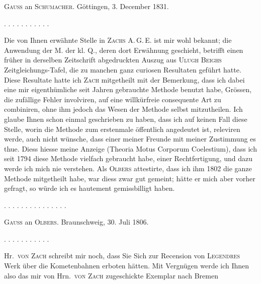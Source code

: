 \clearpage
{}
\begin{center}
\textsc{Gauss} an \textsc{Schumacher}. Göttingen, 3. December 1831.
\end{center}

\begin{center}
. . . . . . . . . . .
\end{center}

Die von Ihnen erwähnte Stelle in \textsc{Zachs} A.\,G.\,E. ist mir wohl bekannt; die Anwendung der M. der kl. Q., deren dort Erwähnung geschieht, betrifft einen früher in derselben Zeitschrift abgedruckten Auszug aus \textsc{Ulugh Beighs} Zeitgleichungs-Tafel, die zu manchen ganz curiosen Resultaten geführt hatte. Diese Resultate hatte ich \textsc{Zach} mitgetheilt mit der Bemerkung, dass ich dabei eine mir eigenthümliche seit Jahren gebrauchte Methode benutzt habe, Grössen, die zufällige Fehler involviren, auf eine willkürfreie consequente Art zu combiniren, ohne ihm jedoch das Wesen der Methode selbst mitzutheilen. Ich glaube Ihnen schon einmal geschrieben zu haben, dass ich auf keinen Fall diese Stelle, worin die Methode zum erstenmale öffentlich angedeutet ist, releviren werde, auch nicht wünsche, dass einer meiner Freunde mit meiner Zustimmung es thue. Diess hiesse  meine Anzeige (Theoria Motus Corporum Coelestium), dass ich seit 1794 diese Methode vielfach gebraucht habe, einer Rechtfertigung, und dazu werde ich mich nie verstehen. Als \textsc{Olbers} attestirte, dass ich ihm 1802 die ganze Methode mitgetheilt habe, war diess zwar gut gemeint; hätte er mich aber vorher gefragt, so würde ich es hautement gemissbilligt haben.

\begin{center}
. . . . . . . . . . . . . . .
\end{center}

\begin{center}
\textsc{Gauss} an \textsc{Olbers}. Braunschweig, 30. Juli 1806.
\end{center}

\begin{center}
. . . . . . . . . . .
\end{center}

Hr.\ \textsc{von Zach} schreibt mir noch, dass Sie Sich zur Recension von \textsc{Legendres} Werk über die Kometenbahnen erboten hätten. Mit Vergnügen werde ich Ihnen also das mir von Hrn.\ \textsc{von Zach} zugeschickte Exemplar nach Bremen
